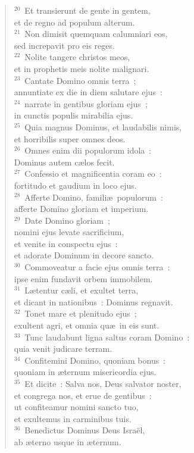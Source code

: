 \begin{flushleft}
\begin{verse}
${}^{20}$~Et transierunt de gente in gentem,\\ et de regno ad populum alterum.\\
${}^{21}$~Non dimisit quemquam calumniari eos,\\ sed increpavit pro eis reges.\\
${}^{22}$~Nolite tangere christos meos,\\ et in prophetis meis nolite malignari.\\
${}^{23}$~Cantate Domino omnis terra~;\\ annuntiate ex die in diem salutare ejus~:\\
${}^{24}$~narrate in gentibus gloriam ejus~;\\ in cunctis populis mirabilia ejus.\\
${}^{25}$~Quia magnus Dominus, et laudabilis nimis,\\ et horribilis super omnes deos.\\
${}^{26}$~Omnes enim dii populorum idola~:\\ Dominus autem c\ae los fecit.\\
${}^{27}$~Confessio et magnificentia coram eo~:\\ fortitudo et gaudium in loco ejus.\\
${}^{28}$~Afferte Domino, famili\ae\ populorum~:\\ afferte Domino gloriam et imperium.\\
${}^{29}$~Date Domino gloriam~;\\ nomini ejus levate sacrificium,\\ et venite in conspectu ejus~:\\ et adorate Dominum in decore sancto.\\
${}^{30}$~Commoveatur a facie ejus omnis terra~:\\ ipse enim fundavit orbem immobilem.\\
${}^{31}$~L\ae tentur c\ae li, et exultet terra,\\ et dicant in nationibus~: Dominus regnavit.\\
${}^{32}$~Tonet mare et plenitudo ejus~;\\ exultent agri, et omnia qu\ae\ in eis sunt.\\
${}^{33}$~Tunc laudabunt ligna saltus coram Domino~:\\ quia venit judicare terram.\\
${}^{34}$~Confitemini Domino, quoniam bonus~:\\ quoniam in \ae ternum misericordia ejus.\\
${}^{35}$~Et dicite~: Salva nos, Deus salvator noster,\\ et congrega nos, et erue de gentibus~:\\ ut confiteamur nomini sancto tuo,\\ et exultemus in carminibus tuis.\\
${}^{36}$~Benedictus Dominus Deus Isra\"el,\\ ab \ae terno usque in \ae ternum.\end{verse}\end{flushleft}

